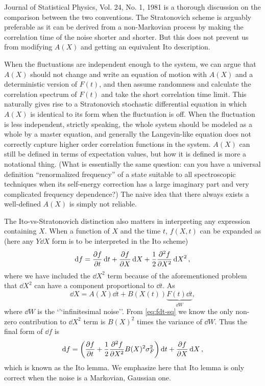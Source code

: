 \documentclass[hyperref, a4paper]{article}
\begin{document}
Journal of Statistical Physics, Vol. 24, No. 1, 1981 is a thorough discussion 
on the comparison between the two conventions.
The Stratonovich scheme is arguably preferable as it can be derived from 
a non-Markovian process by making the correlation time of the noise shorter and shorter.
But this does not prevent us from modifying $A(X)$ and getting an equivalent Ito description.

When the fluctuations are independent enough to the system,
we can argue that $A(X)$ should not change and write an equation of motion with
$A(X)$ and a deterministic version of $F(t)$,
and then assume randomness and calculate the correlation spectrum of $F(t)$
and take the short correlation time limit.
This naturally gives rise to a Stratonovich stochastic differential equation
in which $A(X)$ is identical to its form when the fluctuation is off.
When the fluctuation is less independent,
strictly speaking, the whole system should be modeled as a whole by a master equation,
and generally the Langevin-like equation does not correctly capture
higher order correlation functions in the system.
$A(X)$ can still be defined in terms of expectation values,
but how it is defined is more a notational thing.
(What is essentially the same question:
can you have a universal definition ``renormalized frequency'' of a state 
suitable to all spectroscopic techniques
when its self-energy correction has a large imaginary part and very complicated frequency dependence?)
The naive idea that there always exists a well-defined $A(X)$
is simply not reliable.

The Ito-vs-Stratonovich distinction also matters in interpreting any expression containing $X$.
When a function of $X$ and the time $t$, $f(X, t)$ can be expanded as
(here any $Y \dd{X}$ form is to be interpreted in the Ito scheme)
\begin{equation}
    \dd{f} = \pdv{f}{t} \dd{t} + \pdv{f}{X} \dd{X} + \frac{1}{2} \pdv[2]{f}{X} \dd{X}^2 ,
    \label{eq:taylor}
\end{equation}
where we have included the $\dd{X}^2$ term because of the aforementioned problem that 
$\dd{X}^2$ can have a component proportional to $\dd{t}$.
As 
\begin{equation}
    \dd{X} = A(X) \dd{t} + B(X(t)) \underbrace{F(t) \dd{t}}_{\dd{W}},
\end{equation}
where $\dd{W}$ is the `'`infinitesimal noise''.
From \eqref{eq:fdt-sq} we know the only non-zero contribution to $\dd{X}^2$ term
is $B(X)^2$ times the variance of $\dd{W}$.
Thus the final form of $\dd{f}$ is 
\begin{equation}
    \dd{f} = \left(
        \pdv{f}{t} + \frac{1}{2} \pdv[2]{f}{X} B(X)^2 \sigma_F^2
    \right) \dd{t} + \pdv{f}{X} \dd{X},
\end{equation}
which is known as the Ito lemma.
We emphasize here that Ito lemma is only correct when the noise is a Markovian, Gaussian one.
\end{document}
